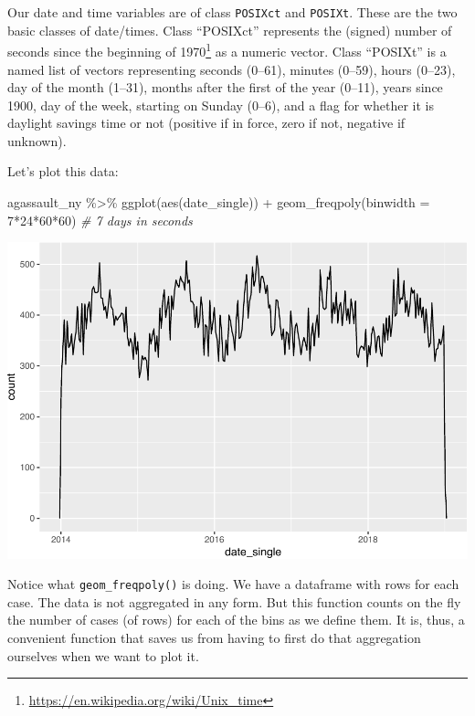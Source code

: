 \documentclass[
  krantz2]{krantz}
\makeatletter
\newenvironment{Shaded}{\begin{snugshade}}{\end{snugshade}}
\newcommand{\AttributeTok}[1]{\textcolor[rgb]{0.61,0.61,0.61}{#1}}
\newcommand{\CommentTok}[1]{\textcolor[rgb]{0.37,0.37,0.37}{\textit{#1}}}
\newcommand{\DecValTok}[1]{\textcolor[rgb]{0.06,0.06,0.06}{#1}}
\newcommand{\FunctionTok}[1]{\textcolor[rgb]{0,0,0}{#1}}
\newcommand{\NormalTok}[1]{#1}
\newcommand{\SpecialCharTok}[1]{\textcolor[rgb]{0,0,0}{#1}}
\renewcommand{\href}[2]{#2\footnote{\url{#1}}}
\newenvironment{kframe}{%
\medskip{}
\setlength{\fboxsep}{.8em}
 \def\at@end@of@kframe{}%
 \ifinner\ifhmode%
  \def\at@end@of@kframe{\end{minipage}}%
  \begin{minipage}{\columnwidth}%
 \fi\fi%
 \def\FrameCommand##1{\hskip\@totalleftmargin \hskip-\fboxsep
 \colorbox{shadecolor}{##1}\hskip-\fboxsep
     \hskip-\linewidth \hskip-\@totalleftmargin \hskip\columnwidth}%
 \MakeFramed {\advance\hsize-\width
   \@totalleftmargin\z@ \linewidth\hsize
   \@setminipage}}%
 {\par\unskip\endMakeFramed%
 \at@end@of@kframe}
\renewenvironment{Shaded}{\begin{kframe}}{\end{kframe}}
\makeatother
\begin{document}
Our date and time variables are of class \texttt{POSIXct} and \texttt{POSIXt}. These are the two basic classes of date/times. Class ``POSIXct'' represents the (signed) \href{https://en.wikipedia.org/wiki/Unix_time}{number of seconds since the beginning of 1970} as a numeric vector. Class ``POSIXt'' is a named list of vectors representing seconds (0--61), minutes (0--59), hours (0--23), day of the month (1--31), months after the first of the year (0--11), years since 1900, day of the week, starting on Sunday (0--6), and a flag for whether it is daylight savings time or not (positive if in force, zero if not, negative if unknown).

Let's plot this data:

\begin{Shaded}
\begin{Highlighting}[]
\NormalTok{agassault\_ny }\SpecialCharTok{\%\textgreater{}\%} 
  \FunctionTok{ggplot}\NormalTok{(}\FunctionTok{aes}\NormalTok{(date\_single)) }\SpecialCharTok{+} 
  \FunctionTok{geom\_freqpoly}\NormalTok{(}\AttributeTok{binwidth =} \DecValTok{7}\SpecialCharTok{*}\DecValTok{24}\SpecialCharTok{*}\DecValTok{60}\SpecialCharTok{*}\DecValTok{60}\NormalTok{) }\CommentTok{\# 7 days in seconds}
\end{Highlighting}
\end{Shaded}

\includegraphics{crime_mapping_files/figure-latex/ggplot_8b-1.pdf}

Notice what \texttt{geom\_freqpoly()} is doing. We have a dataframe with rows for each case. The data is not aggregated in any form. But this function counts on the fly the number of cases (of rows) for each of the bins as we define them. It is, thus, a convenient function that saves us from having to first do that aggregation ourselves when we want to plot it.
\end{document}
